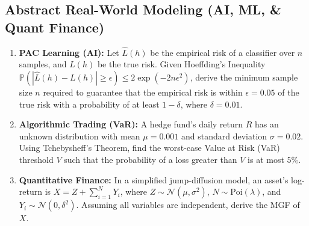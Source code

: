 \documentclass[11pt, a4paper]{article}
\theoremstyle{definition}
\theoremstyle{remark}
\newcommand{\Prob}{\mathbb{P}}
\begin{document}
\subsection{Abstract Real-World Modeling (AI, ML, \& Quant Finance)}
\begin{enumerate}[label=\textbf{\arabic*.}, resume]
    \item \textbf{PAC Learning (AI):} Let $\hat{L}(h)$ be the empirical risk of a classifier over $n$ samples, and $L(h)$ be the true risk. Given Hoeffding's Inequality $\Prob(|\hat{L}(h) - L(h)| \ge \epsilon) \le 2\exp(-2n\epsilon^2)$, derive the minimum sample size $n$ required to guarantee that the empirical risk is within $\epsilon = 0.05$ of the true risk with a probability of at least $1 - \delta$, where $\delta = 0.01$.
    \item \textbf{Algorithmic Trading (VaR):} A hedge fund's daily return $R$ has an unknown distribution with mean $\mu = 0.001$ and standard deviation $\sigma = 0.02$. Using Tchebysheff's Theorem, find the worst-case Value at Risk (VaR) threshold $V$ such that the probability of a loss greater than $V$ is at most $5\%$.
    \item \textbf{Quantitative Finance:} In a simplified jump-diffusion model, an asset's log-return is $X = Z + \sum_{i=1}^N Y_i$, where $Z \sim \mathcal{N}(\mu, \sigma^2)$, $N \sim \text{Poi}(\lambda)$, and $Y_i \sim \mathcal{N}(0, \delta^2)$. Assuming all variables are independent, derive the MGF of $X$.
\end{enumerate}
\end{document}
